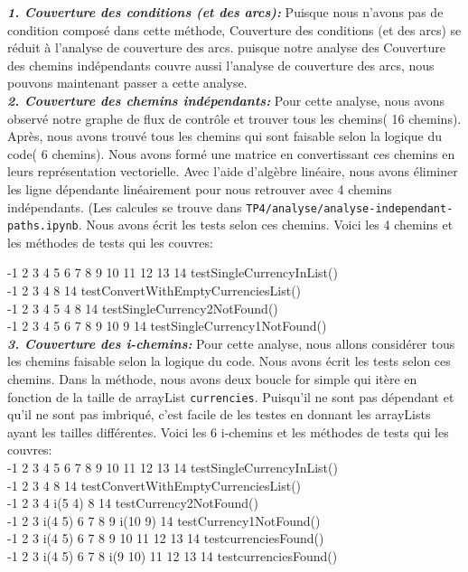 \documentclass[11pt]{article}
\begin{document}
\textbf{\textit{1. Couverture des conditions (et des arcs):}} Puisque nous n'avons pas de condition composé dans cette méthode, Couverture des conditions (et des arcs) se réduit à l'analyse de couverture des arcs. puisque notre analyse des Couverture des chemins indépendants couvre aussi l'analyse de couverture des arcs, nous pouvons maintenant passer a cette analyse. \\
\textbf{\textit{2. Couverture des chemins indépendants:}} Pour cette analyse, nous avons observé notre graphe de flux de contrôle et trouver tous les chemins( 16 chemins). Après, nous avons trouvé tous les chemins qui sont faisable selon la logique du code( 6 chemins). Nous avons formé une matrice en convertissant ces chemins en leurs représentation vectorielle. Avec l'aide d'algèbre linéaire, nous avons éliminer les ligne dépendante linéairement pour nous retrouver avec 4 chemins indépendants. (Les calcules se trouve dans \texttt{TP4/analyse/analyse-independant-paths.ipynb}. Nous avons écrit les tests selon ces chemins. Voici les 4 chemins et les méthodes de tests qui les couvres:

\hspace{-6mm}
-1 2 3 4 5 6 7 8 9 10 11 12 13 14  \hfill testSingleCurrencyInList() \\
-1 2 3 4 8 14                     \hfill  testConvertWithEmptyCurrenciesList() \\      
-1 2 3 4 5 4 8 14                \hfill   testSingleCurrency2NotFound() \\
-1 2 3 4 5 6 7 8 9 10 9 14       \hfill   testSingleCurrency1NotFound() \\


\textbf{\textit{3. Couverture des i-chemins:}} Pour cette analyse, nous allons considérer tous les chemins faisable selon la logique du code. Nous avons écrit les tests selon ces chemins. Dans la méthode, nous avons deux boucle for simple qui itère en fonction de la taille de arrayList \texttt{currencies}. Puisqu'il ne sont pas dépendant  et qu'il ne sont pas imbriqué, c'est facile de les testes en donnant les arrayLists ayant les tailles différentes.  Voici les 6 i-chemins et les méthodes de tests qui les couvres: \\ 

\hspace{-6mm}
-1 2 3 4 5 6 7 8 9 10 11 12 13 14  \hfill testSingleCurrencyInList() \\
-1 2 3 4 8 14                   \hfill    testConvertWithEmptyCurrenciesList() \\      
-1 2 3 4 i(5 4) 8 14            \hfill    testCurrency2NotFound() \\
-1 2 3 i(4 5) 6 7 8 9 i(10 9) 14 \hfill     testCurrency1NotFound() \\
-1 2 3 i(4 5) 6 7 8 9 10 11 12 13 14 \hfill testcurrenciesFound() \\
-1 2 3 i(4 5) 6 7 8 i(9 10) 11 12 13 14 \hfill testcurrenciesFound() \\ 
\end{document}
